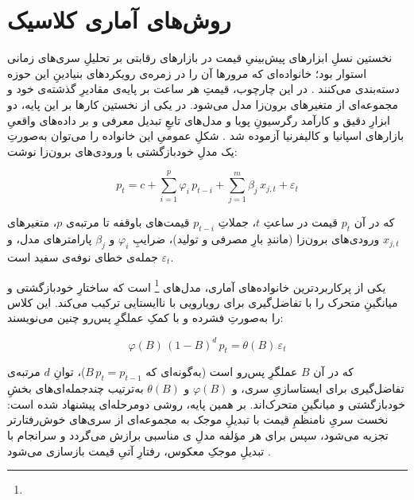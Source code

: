 
\section{روش‌های آماری کلاسیک}

نخستین نسلِ ابزارهای پیش‌بینیِ قیمت در بازارهای رقابتی بر تحلیلِ سری‌های زمانی
استوار بود؛ خانواده‌ای که مرورها آن را در زمره‌ی رویکردهای بنیادینِ این حوزه
دسته‌بندی می‌کنند \cite{aggarwal_electricity_2009}. در این چارچوب، قیمتِ هر ساعت
بر پایه‌ی مقادیرِ گذشته‌ی خود و مجموعه‌ای از متغیرهای برون‌زا مدل می‌شود. در یکی
از نخستین کارها بر این پایه، دو ابزارِ دقیق و کارآمد  رگرسیونِ پویا و
مدل‌های تابعِ تبدیل  معرفی و بر داده‌های واقعیِ بازارهای اسپانیا و کالیفرنیا
آزموده شد \cite{nogales_forecasting_2002}. شکلِ عمومیِ این خانواده را می‌توان
به‌صورتِ یک مدلِ خودبازگشتی با ورودی‌های برون‌زا نوشت:

\begin{equation}
p_t = c + \sum_{i=1}^{p}\varphi_i\,p_{t-i} + \sum_{j=1}^{m}\beta_j\,x_{j,t} + \varepsilon_t
\end{equation}

که در آن $p_t$ قیمت در ساعتِ $t$، جملاتِ $p_{t-i}$ قیمت‌های باوقفه تا مرتبه‌ی
$p$، متغیرهای $x_{j,t}$ ورودی‌های برون‌زا (مانندِ بارِ مصرفی و تولید)، ضرایبِ
$\varphi_i$ و $\beta_j$ پارامترهای مدل، و $\varepsilon_t$ جمله‌ی خطای نوفه‌ی سفید
است.

یکی از پرکاربردترین خانواده‌های آماری، مدل‌های \footnote{} است که ساختارِ
خودبازگشتی و میانگینِ متحرک را با تفاضل‌گیری برای رویارویی با ناایستایی ترکیب
می‌کند. این کلاس را به‌صورتِ فشرده و با کمکِ عملگرِ پس‌رو چنین می‌نویسند:

\begin{equation}
\varphi(B)\,(1-B)^{d}\,p_t = \theta(B)\,\varepsilon_t
\end{equation}

که در آن $B$ عملگرِ پس‌رو است (به‌گونه‌ای که $B\,p_t = p_{t-1}$)، توانِ $d$
مرتبه‌ی تفاضل‌گیری برای ایستاسازیِ سری، و $\varphi(B)$ و $\theta(B)$ به‌ترتیب
چندجمله‌ای‌های بخشِ خودبازگشتی و میانگینِ متحرک‌اند. بر همین پایه، روشی دومرحله‌ای
پیشنهاد شده است: نخست سریِ نامنظمِ قیمت با تبدیلِ موجک به مجموعه‌ای از سری‌های
خوش‌رفتارتر تجزیه می‌شود، سپس برای هر مؤلفه مدلِ ی مناسبی برازش می‌گردد
و سرانجام با تبدیلِ موجکِ معکوس، رفتارِ آتیِ قیمت بازسازی می‌شود
\cite{conejo_day-ahead_2005}.

